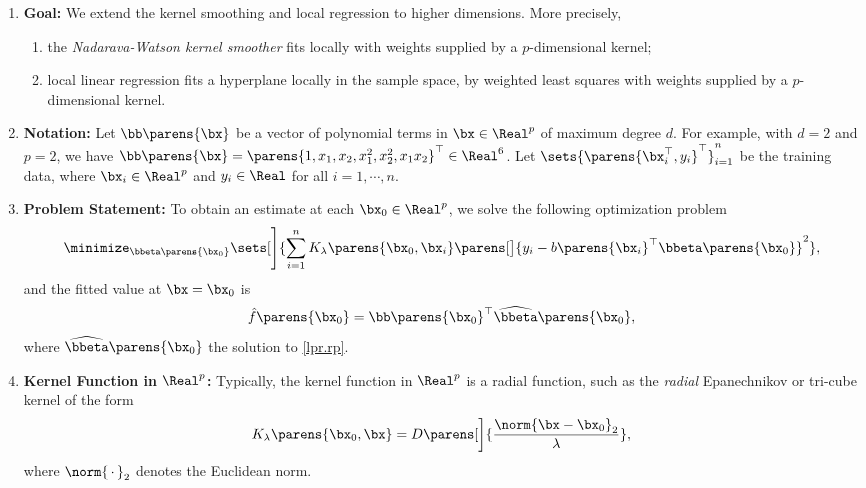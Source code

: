 \documentclass[12pt]{article}
\begin{document}
\begin{enumerate}[label=\textbf{\arabic*.}]

	\item \textbf{Goal:} We extend the kernel smoothing and local regression to higher dimensions. More precisely, 
	\begin{enumerate}
		\item the \emph{Nadarava-Watson kernel smoother} fits locally with weights supplied by a $p$-dimensional kernel; 
		\item local linear regression fits a hyperplane locally in the sample space, by weighted least squares with weights supplied by a $p$-dimensional kernel. 
	\end{enumerate}
	
	\item \textbf{Notation:} Let $\bb \parens{\bx}$ be a vector of polynomial terms in $\bx \in \Real^p$ of maximum degree $d$. For example, with $d = 2$ and $p = 2$, we have $\bb \parens{\bx} = \parens{1, x_1, x_2, x_1^2, x_2^2, x_1 x_2}^\top \in \Real^6$. Let $\sets{\parens{\bx_i^\top, y_i}^\top}_{i=1}^n$ be the training data, where $\bx_i \in \Real^p$ and $y_i \in \Real$ for all $i = 1, \cdots, n$. 
	
	\item \textbf{Problem Statement:} To obtain an estimate at each $\bx_0 \in \Real^p$, we solve the following optimization problem 
	\begin{align}\label{lpr.rp}
		\minimize_{\bbeta \parens{\bx_0}} \sets[\Bigg]{\sum_{i=1}^n K_\lambda \parens{\bx_0, \bx_i} \parens[\big]{y_i - b \parens{\bx_i}^\top  \bbeta \parens{\bx_0}}^2}, 
	\end{align}
	and the fitted value at $\bx = \bx_0$ is
	\begin{equation*}
		\hat{f} \parens{\bx_0} = \bb \parens{\bx_0}^\top \widehat{\bbeta} \parens{\bx_0}, 
	\end{equation*}
	where $\widehat{\bbeta} \parens{\bx_0}$ the solution to \eqref{lpr.rp}. 
	
	\item \textbf{Kernel Function in $\Real^p$:} Typically, the kernel function in $\Real^p$ is a radial function, such as the \textit{radial} Epanechnikov or tri-cube kernel of the form 
	\begin{align*}
		K_\lambda \parens{\bx_0 , \bx} = D \parens[\bigg]{ \frac{\norm{\bx - \bx_0}_2}{\lambda}}, 
	\end{align*}
	where $\norm{\,\cdot\,}_2$ denotes the Euclidean norm. 
	

\end{enumerate}
\end{document}
